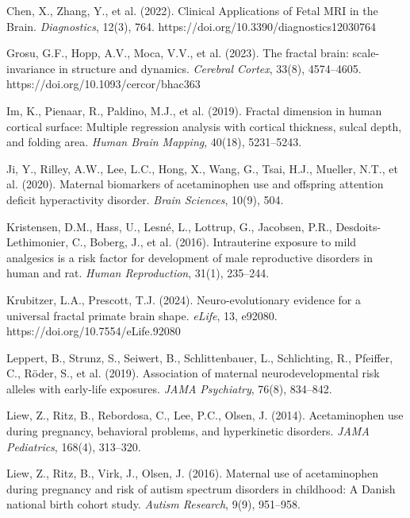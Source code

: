 \documentclass[12pt]{article}
\begin{document}
\begin{thebibliography}{99}
Chen, X., Zhang, Y., et al. (2022).
Clinical Applications of Fetal MRI in the Brain.
\textit{Diagnostics}, 12(3), 764.
https://doi.org/10.3390/diagnostics12030764

Grosu, G.F., Hopp, A.V., Moca, V.V., et al. (2023).
The fractal brain: scale-invariance in structure and dynamics.
\textit{Cerebral Cortex}, 33(8), 4574--4605.
https://doi.org/10.1093/cercor/bhac363

Im, K., Pienaar, R., Paldino, M.J., et al. (2019).
Fractal dimension in human cortical surface: Multiple regression analysis with cortical thickness, sulcal depth, and folding area.
\textit{Human Brain Mapping}, 40(18), 5231--5243.

Ji, Y., Rilley, A.W., Lee, L.C., Hong, X., Wang, G., Tsai, H.J., Mueller, N.T., et al. (2020).
Maternal biomarkers of acetaminophen use and offspring attention deficit hyperactivity disorder.
\textit{Brain Sciences}, 10(9), 504.

Kristensen, D.M., Hass, U., Lesné, L., Lottrup, G., Jacobsen, P.R., Desdoits-Lethimonier, C., Boberg, J., et al. (2016).
Intrauterine exposure to mild analgesics is a risk factor for development of male reproductive disorders in human and rat.
\textit{Human Reproduction}, 31(1), 235--244.

Krubitzer, L.A., Prescott, T.J. (2024).
Neuro-evolutionary evidence for a universal fractal primate brain shape.
\textit{eLife}, 13, e92080.
https://doi.org/10.7554/eLife.92080

Leppert, B., Strunz, S., Seiwert, B., Schlittenbauer, L., Schlichting, R., Pfeiffer, C., Röder, S., et al. (2019).
Association of maternal neurodevelopmental risk alleles with early-life exposures.
\textit{JAMA Psychiatry}, 76(8), 834--842.

Liew, Z., Ritz, B., Rebordosa, C., Lee, P.C., Olsen, J. (2014).
Acetaminophen use during pregnancy, behavioral problems, and hyperkinetic disorders.
\textit{JAMA Pediatrics}, 168(4), 313--320.

Liew, Z., Ritz, B., Virk, J., Olsen, J. (2016).
Maternal use of acetaminophen during pregnancy and risk of autism spectrum disorders in childhood: A Danish national birth cohort study.
\textit{Autism Research}, 9(9), 951--958.


\end{thebibliography}
\end{document}

